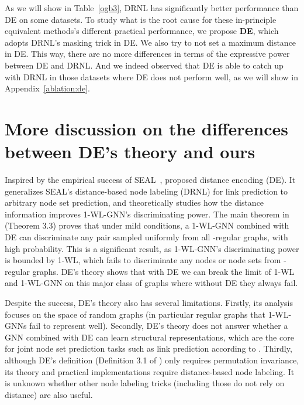 \documentclass{article}
\begin{document}
As we will show in Table~\ref{ogb3}, DRNL has significantly better performance than DE on some datasets. To study what is the root cause for these in-principle equivalent methods's different practical performance, we propose \textbf{DE}, which adopts DRNL's masking trick in DE. We also try to not set a maximum distance in DE. This way, there are no more differences in terms of the expressive power between DE and DRNL. And we indeed observed that DE is able to catch up with DRNL in those datasets where DE does not perform well, as we will show in Appendix~\ref{ablation:de}.




\section{More discussion on the differences between DE's theory and ours}\label{DEdiscussion}
Inspired by the empirical success of SEAL~\citep{zhang2018link}, \citet{li2020distance} proposed distance encoding (DE). It generalizes SEAL's distance-based node labeling (DRNL) for link prediction to arbitrary node set prediction, and theoretically studies how the distance information improves 1-WL-GNN's discriminating power. The main theorem in \citep{li2020distance} (Theorem 3.3) proves that under mild conditions, a 1-WL-GNN combined with DE can discriminate any  pair sampled uniformly from all -regular graphs, with high probability. This is a significant result, as 1-WL-GNN's discriminating power is bounded by 1-WL, which fails to discriminate any nodes or node sets from -regular graphs. DE's theory shows that with DE we can break the limit of 1-WL and 1-WL-GNN on this major class of graphs where without DE they always fail. 

Despite the success, DE's theory also has several limitations. Firstly, its analysis focuses on the space of random graphs (in particular regular graphs that 1-WL-GNNs fail to represent well). Secondly, DE's theory does not answer whether a GNN combined with DE can learn structural representations, which are the core for joint node set prediction tasks such as link prediction according to \citep{Srinivasan2020On}. Thirdly, although DE's definition (Definition 3.1 of \citep{li2020distance}) only requires permutation invariance, its theory and practical implementations require distance-based node labeling. It is unknown whether other node labeling tricks (including those do not rely on distance) are also useful.
\end{document}
